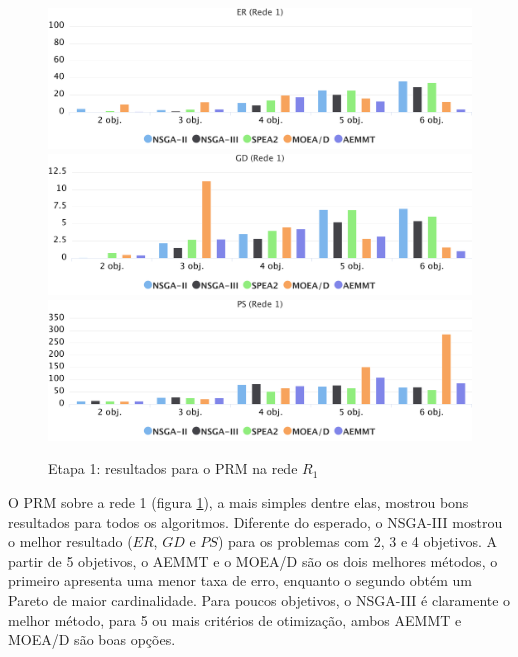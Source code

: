 \begin{figure}[!htbp]
	\caption{Etapa 1: resultados para o PRM na rede $R_1$}
	\label{fig_exp1_prm_r1}
	\includegraphics[width=1\textwidth]{cap_experimentos/figs/etapa1/er-mrp-r1}
	\includegraphics[width=1\textwidth]{cap_experimentos/figs/etapa1/gd-mrp-r1}
	\includegraphics[width=1\textwidth]{cap_experimentos/figs/etapa1/ps-mrp-r1}
\end{figure}

O PRM sobre a rede 1 (figura \ref{fig_exp1_prm_r1}), a mais simples dentre elas, mostrou bons resultados para todos os algoritmos. Diferente do esperado, o NSGA-III mostrou o melhor resultado ($ER$, $GD$ e $PS$) para os problemas com 2, 3 e 4 objetivos. A partir de 5 objetivos, o AEMMT e o MOEA/D são os dois melhores métodos, o primeiro apresenta uma menor taxa de erro, enquanto o segundo obtém um Pareto de maior cardinalidade. Para poucos objetivos, o NSGA-III é claramente o melhor método, para 5 ou mais critérios de otimização, ambos AEMMT e MOEA/D são boas opções.

